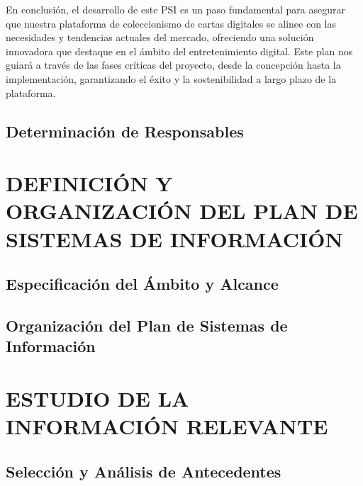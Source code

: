 En conclusión, el desarrollo de este PSI es un paso fundamental para asegurar que nuestra plataforma de coleccionismo de cartas digitales se alinee con las necesidades y tendencias actuales del mercado, ofreciendo una solución innovadora que destaque en el ámbito del entretenimiento digital. Este plan nos guiará a través de las fases críticas del proyecto, desde la concepción hasta la implementación, garantizando el éxito y la sostenibilidad a largo plazo de la plataforma.



\subsection{Determinación de Responsables}


\newpage
\section{DEFINICIÓN Y ORGANIZACIÓN DEL PLAN DE SISTEMAS DE INFORMACIÓN}
 

\subsection{Especificación del Ámbito y Alcance} 


\subsection{Organización del Plan de Sistemas de Información }



\newpage
\section{ESTUDIO DE LA INFORMACIÓN RELEVANTE}
 
\subsection{Selección y Análisis de Antecedentes} 
